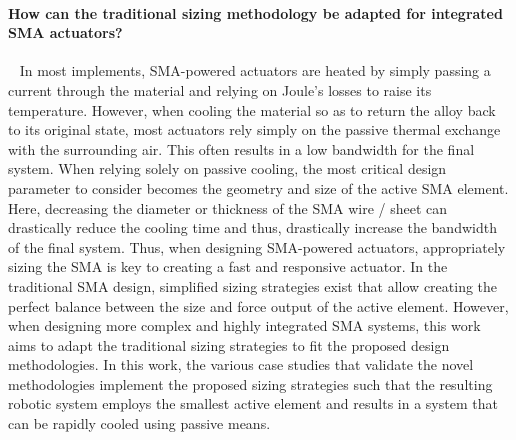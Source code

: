 \paragraph{How can the traditional sizing methodology be adapted for integrated SMA actuators?}~
In most implements, SMA-powered actuators are heated by simply passing a current through the material and relying on Joule's losses to raise its temperature. However, when cooling the material so as to return the alloy back to its original state, most actuators rely simply on the passive thermal exchange with the surrounding air. This often results in a low bandwidth for the final system. When relying solely on passive cooling, the most critical design parameter to consider becomes the geometry and size of the active SMA element. Here, decreasing the diameter or thickness of the SMA wire / sheet can drastically reduce the cooling time and thus, drastically increase the bandwidth of the final system. Thus, when designing SMA-powered actuators, appropriately sizing the SMA is key to creating a fast and responsive actuator. In the traditional SMA design, simplified sizing strategies exist that allow creating the perfect balance between the size and force output of the active element. However, when designing more complex and highly integrated SMA systems, this work aims to adapt the traditional sizing strategies to fit the proposed design methodologies. In this work, the various case studies that validate the novel methodologies implement the proposed sizing strategies such that the resulting robotic system employs the smallest active element and results in a system that can be rapidly cooled using passive means.

